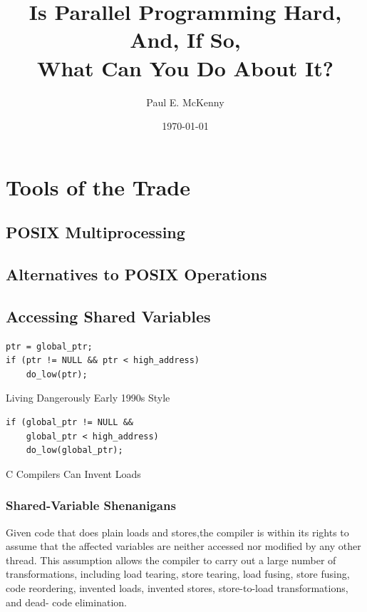 \documentclass[11pt]{article}
\author{Paul E. McKenny}
\date{\today}
\title{Is Parallel Programming Hard, And, If So, \\What Can You Do About It?}
\begin{document}
\maketitle
\tableofcontents

\section{Tools of the Trade}
\label{sec:org044927f}
\subsection{POSIX Multiprocessing}
\label{sec:org88b8fd0}
\subsection{Alternatives to POSIX Operations}
\label{sec:org4a6be65}
\subsection{Accessing Shared Variables}
\label{sec:org436d6c4}
\begin{listing}[htbp]
\begin{verbatim}
ptr = global_ptr;
if (ptr != NULL && ptr < high_address)
    do_low(ptr);
\end{verbatim}
\caption{\label{l4.14}Living Dangerously Early 1990s Style}
\end{listing}

\begin{listing}[htbp]
\begin{verbatim}
if (global_ptr != NULL &&
    global_ptr < high_address)
    do_low(global_ptr);
\end{verbatim}
\caption{\label{l4.15}C Compilers Can Invent Loads}
\end{listing}
\subsubsection{Shared-Variable Shenanigans}
\label{sec:org4e4d4fa}
Given code that does plain loads and stores,the compiler is within its rights to assume that the
affected variables are neither accessed nor modified by any other thread. This assumption allows the
compiler to carry out a large number of transformations, including load tearing, store tearing, load
fusing, store fusing, code reordering, invented loads, invented stores, store-to-load transformations,
and dead- code elimination.
\end{document}
